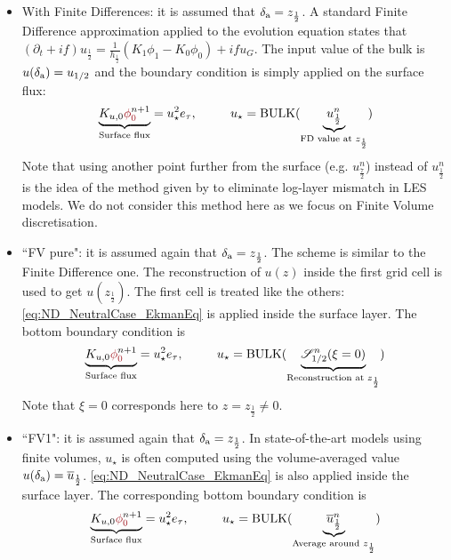   \begin{itemize}
	  \item With Finite Differences:
		  it is assumed that
		  $\delta_{\rm a} = z_{\frac{1}{2}}$.
		A standard Finite Difference approximation applied to
		  the evolution equation states that
		  $(\partial_t+if) u_{\frac{1}{2}}
		  =\frac{1}{h_{\frac{1}{2}}}(K_1\phi_1 - K_0\phi_0)
		  + if u_G$.
		  The input value of the bulk is
		  $u(\delta_{\rm a}) = u_{1/2}$ and the boundary
		  condition is simply applied on the surface flux:
		\begin{equation}
			\underbrace{K_{u,0}
			\emphase{\phi}^{n+1}_\emphase{0}}_{\text{Surface flux}}
		= u_\star^2 e_\tau, ~~~~~~~~
			u_\star = {\rm BULK}(
			\underbrace{u_{\frac{1}{2}}^{n}}_{
				\text{FD value at }
			z_{\frac{1}{2}}})
		\end{equation}
		  Note that using another point further from
		  the surface (e.g. $u_{\frac{7}{2}}^n$) instead
		  of $u_{\frac{1}{2}}^n$ is the idea of the method
		  given by \citep{kawai_wall-modeling_2012}
		  to eliminate log-layer mismatch in LES models.
		  We do not consider this method here as we focus
		  on Finite Volume discretisation.
	  \item ``FV pure": it is assumed again that
		  $\delta_{\rm a} = z_{\frac{1}{2}}$.
		  The scheme is similar to the Finite Difference one.
	    The reconstruction of $u(z)$ inside the first grid cell
		  is used to get $u(z_{\frac{1}{2}})$.
		  The first cell is treated like the others:
		  \eqref{eq:ND_NeutralCase_EkmanEq} is
		  applied inside the surface layer.
	The bottom boundary condition is
	\begin{equation}
		\underbrace{K_{u,0} \emphase{\phi}^{n+1}_\emphase{0}}_{\text{Surface flux}}
		= u_\star^2 e_\tau, ~~~~~~~~
			u_\star = {\rm BULK}(
			\underbrace{{\cal S}_{1/2}^{n}(\xi=0)}_{
				\text{Reconstruction at }
			z_{\frac{1}{2}}})
	\end{equation}
		  Note that $\xi=0$ corresponds here
		  to $z=z_{\frac{1}{2}}\neq 0$.
	  \item ``FV1": it is assumed again that
		  $\delta_{\rm a} = z_{\frac{1}{2}}$.
		  In state-of-the-art models using finite volumes,
		  $u_{\star}$ is often computed using the
		  volume-averaged value
		  $u(\delta_{\rm a}) = \overline{u}_{\frac{1}{2}}$.
		  \eqref{eq:ND_NeutralCase_EkmanEq} is
		  also applied inside the surface layer.
		The corresponding bottom boundary condition is
		  \begin{equation}
		\underbrace{K_{u,0} \emphase{\phi}^{n+1}_\emphase{0}}_{\text{Surface flux}}
		= u_\star^2 e_\tau, ~~~~~~~~
			u_\star = {\rm BULK}(
			\underbrace{\overline{u}^{n}_{\frac{1}{2}}}_{
				\text{Average around }
			z_{\frac{1}{2}}})
		  \end{equation}
\end{itemize}
